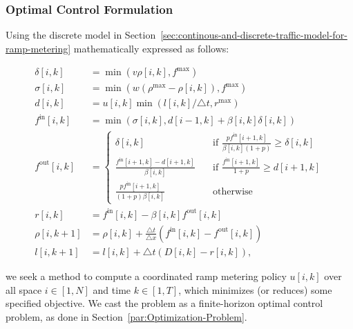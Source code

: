 \subsubsection{Optimal Control Formulation}

Using the discrete model in Section~\ref{sec:continous-and-discrete-traffic-model-for-ramp-metering} mathematically expressed as follows:

\begin{align}
    \delta\left[i,k\right] & = \min\left(v \rho\left[i,k\right], f^{\max} \right) \\
    \sigma\left[i,k\right] & = \min\left(w\left(\rho^{\max} - \rho\left[i,k\right]\right), f^{\max}\right) \\
    d\left[i,k\right] & = u\left[i,k\right]\min \left(l\left[i,k\right] / \triangle t, r^{\max}\right) \\
    f^{\text{in}}\left[i,k\right] & = \min\left(\sigma\left[i,k\right], d\left[i-1,k\right] + \beta\left[i,k\right] \delta\left[i,k\right]\right) \\
    f^{\text{out}}\left[i,k\right] & = 
    \begin{cases}
    \delta\left[i,k\right] & \quad \mbox{if } \frac{p f^{\text{in}}\left[i+1,k\right] }{\beta\left[i,k\right] \left(1 + p\right)} \ge \delta\left[i,k\right] \\
    \frac{f^{\text{in}}\left[i+1,k\right] - d\left[i+1,k\right]}{\beta\left[i,k\right]} & \quad \mbox{if } \frac{f^{\text{in}}[i+1,k]}{1 + p} \ge d\left[i+1,k\right] \\
    \frac{p f^{\text{in}}\left[i+1,k\right]}{\left(1 + p\right) \beta\left[i,k\right]} & \quad \mbox{otherwise}
    \end{cases} \\
    r\left[i,k\right] & = f^{\text{in}}\left[i,k\right] - \beta\left[i,k\right] f^{\text{out}}\left[i,k\right] \\
    \rho\left[i,k+1\right] & = \rho\left[i,k\right] + \frac{\triangle t}{\triangle x} \left(f^{\text{in}}\left[i,k\right] - f^{\text{out}}\left[i,k\right]\right)\\
    l\left[i,k+1\right] & = l\left[i,k\right] + \triangle t \left(D\left[i,k\right] - r\left[i,k\right]\right),
\end{align}

we seek a method to compute a coordinated ramp metering policy $u\left[i,k\right]$ over all space $i\in\left[1,N\right]$ and time $k\in\left[1,T\right]$, which minimizes (or reduces) some specified objective. We cast the problem as a finite-horizon optimal control problem, as done in Section~\ref{par:Optimization-Problem}.

